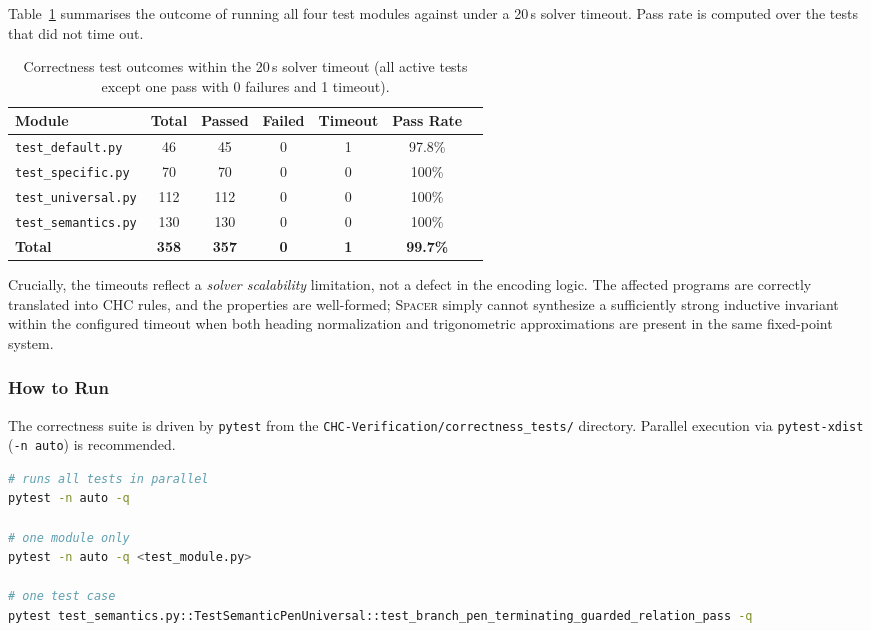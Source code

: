 Table~\ref{tab:correctness-results} summarises the outcome of running all four test modules
against under a 20\,s solver timeout.  Pass rate is computed
over the tests that did not time out.

\begin{table}[H]
\centering
\caption{Correctness test outcomes within the 20\,s solver timeout (all active tests except one pass with 0 failures and 1 timeout).}
\label{tab:correctness-results}
\begin{tabular}{lcccccc}
\toprule
\textbf{Module} & \textbf{Total} & \textbf{Passed} & \textbf{Failed} & \textbf{Timeout} & \textbf{Pass Rate} \\
\midrule
\texttt{test\_default.py}   &  46 &  45 & 0 & 1 & 97.8\% \\
\texttt{test\_specific.py}  &  70 &  70 & 0 & 0 & 100\% \\
\texttt{test\_universal.py} & 112 & 112 & 0 & 0 & 100\% \\
\texttt{test\_semantics.py} & 130 & 130 & 0 & 0 & 100\% \\
\midrule
\textbf{Total} & \textbf{358} & \textbf{357} & \textbf{0} & \textbf{1} & \textbf{99.7\%} \\
\bottomrule
\end{tabular}
\end{table}

\noindent
Crucially, the timeouts reflect a \emph{solver scalability} limitation, not a
defect in the encoding logic.  The affected programs are correctly translated
into CHC rules, and the properties are well-formed; \textsc{Spacer} simply
cannot synthesize a sufficiently strong inductive invariant within the
configured timeout when both heading normalization and trigonometric
approximations are present in the same fixed-point system.  

\subsubsection*{How to Run}

The correctness suite is driven by \texttt{pytest} from the \texttt{CHC-Verification/correctness\_tests/} directory.
Parallel execution via \texttt{pytest-xdist} (\texttt{-n auto}) is recommended.

\begin{lstlisting}[style=terminal, language=bash]
# runs all tests in parallel
pytest -n auto -q 

# one module only
pytest -n auto -q <test_module.py>

# one test case
pytest test_semantics.py::TestSemanticPenUniversal::test_branch_pen_terminating_guarded_relation_pass -q
\end{lstlisting}


